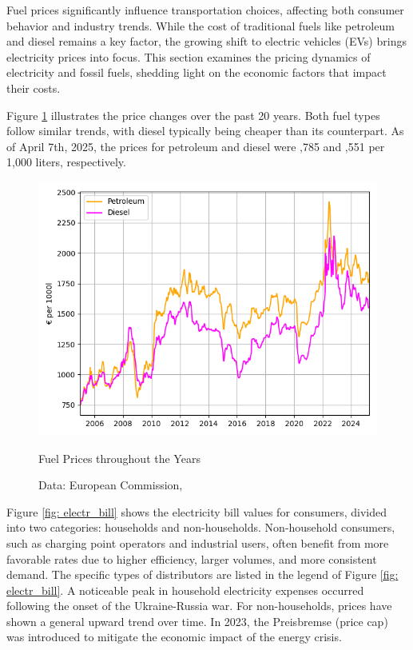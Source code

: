Fuel prices significantly influence transportation choices, affecting both consumer behavior and industry trends. While the cost of traditional fuels like petroleum and diesel remains a key factor, the growing shift to electric vehicles (EVs) brings electricity prices into focus. This section examines the pricing dynamics of electricity and fossil fuels, shedding light on the economic factors that impact their costs.

Figure \ref{fig: fuel_prices} illustrates the price changes over the past 20 years. Both fuel types follow similar trends, with diesel typically being cheaper than its counterpart. As of April 7th, 2025, the prices for petroleum and diesel were ,785 and ,551 per 1,000 liters, respectively.

\begin{figure}[H]
	\begin{center}
		\includegraphics[width=\linewidth]{images/gas_diesel_prices.png}
		\caption{Fuel Prices throughout the Years}
		\label{fig: fuel_prices}
		\caption*{Data: European Commission, \cite{PriceDevelopments}} 
	\end{center}
\end{figure}
Figure \ref{fig: electr_bill} shows the electricity bill values for consumers, divided into two categories: households and non-households. Non-household consumers, such as charging point operators and industrial users, often benefit from more favorable rates due to higher efficiency, larger volumes, and more consistent demand. The specific types of distributors are listed in the legend of Figure \ref{fig: electr_bill}. A noticeable peak in household electricity expenses occurred following the onset of the Ukraine-Russia war. For non-households, prices have shown a general upward trend over time. In 2023, the Preisbremse (price cap) was introduced to mitigate the economic impact of the energy crisis. \cite{BundesregierungStromPreisBremse}
